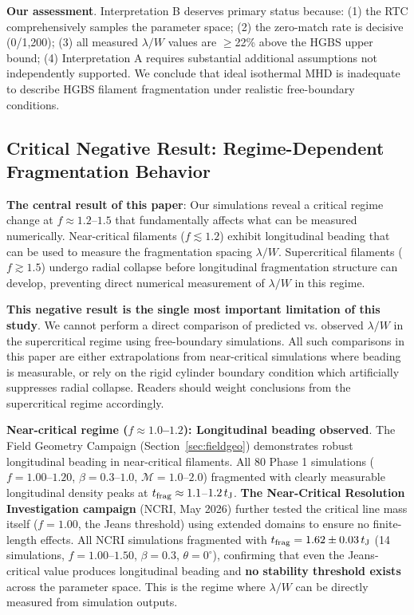 \documentclass[twocolumn,longtitle,usenatbib]{mnras}
\begin{document}
\textbf{Our assessment}. Interpretation B deserves primary status because: (1) the RTC comprehensively samples the parameter space; (2) the zero-match rate is decisive (0/1,200); (3) all measured $\lambda/W$ values are $\geq$22\% above the HGBS upper bound; (4) Interpretation A requires substantial additional assumptions not independently supported. We conclude that ideal isothermal MHD is inadequate to describe HGBS filament fragmentation under realistic free-boundary conditions.

\subsection{Critical Negative Result: Regime-Dependent Fragmentation Behavior}
\label{sec:supercrit_negative}

\textbf{The central result of this paper}: Our simulations reveal a critical regime change at $f \approx 1.2$--$1.5$ that fundamentally affects what can be measured numerically. Near-critical filaments ($f \lesssim 1.2$) exhibit longitudinal beading that can be used to measure the fragmentation spacing $\lambda/W$. Supercritical filaments ($f \gtrsim 1.5$) undergo radial collapse before longitudinal fragmentation structure can develop, preventing direct numerical measurement of $\lambda/W$ in this regime.

\textbf{This negative result is the single most important limitation of this study}. We cannot perform a direct comparison of predicted vs. observed $\lambda/W$ in the supercritical regime using free-boundary simulations. All such comparisons in this paper are either extrapolations from near-critical simulations where beading is measurable, or rely on the rigid cylinder boundary condition which artificially suppresses radial collapse. Readers should weight conclusions from the supercritical regime accordingly.

\textbf{Near-critical regime ($f \approx 1.0$--$1.2$): Longitudinal beading observed}. The Field Geometry Campaign (Section~\ref{sec:fieldgeo}) demonstrates robust longitudinal beading in near-critical filaments. All 80 Phase 1 simulations ($f = 1.00$--$1.20$, $\beta = 0.3$--$1.0$, $\mathcal{M} = 1.0$--$2.0$) fragmented with clearly measurable longitudinal density peaks at $t_{\rm frag} \approx 1.1$--$1.2\,t_{\rm J}$. \textbf{The Near-Critical Resolution Investigation campaign} (NCRI, May 2026) further tested the critical line mass itself ($f = 1.00$, the Jeans threshold) using extended domains to ensure no finite-length effects. All NCRI simulations fragmented with $t_{\rm frag} = 1.62 \pm 0.03\,t_{\rm J}$ (14 simulations, $f = 1.00$--$1.50$, $\beta = 0.3$, $\theta = 0^{\circ}$), confirming that even the Jeans-critical value produces longitudinal beading and \textbf{no stability threshold exists} across the parameter space. This is the regime where $\lambda/W$ can be directly measured from simulation outputs.
\end{document}
